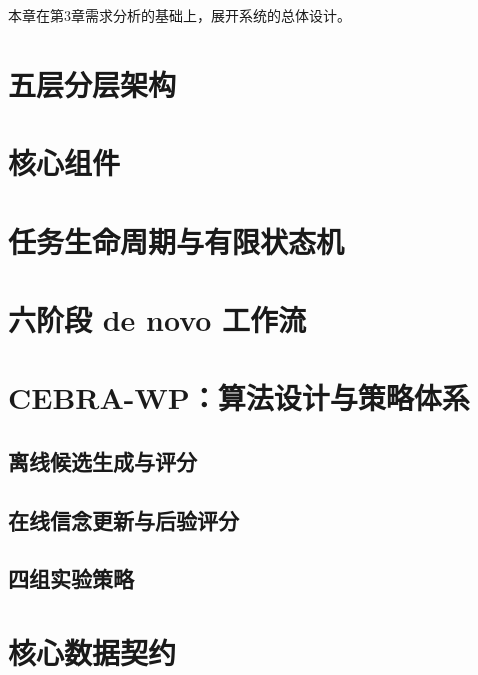 
本章在第3章需求分析的基础上，展开系统的总体设计。

\section{五层分层架构}


\section{核心组件}


\section{任务生命周期与有限状态机}


\section{六阶段 de novo 工作流}


\section{CEBRA-WP：算法设计与策略体系}

\subsection{离线候选生成与评分}


\subsection{在线信念更新与后验评分}


\subsection{四组实验策略}


\section{核心数据契约}

